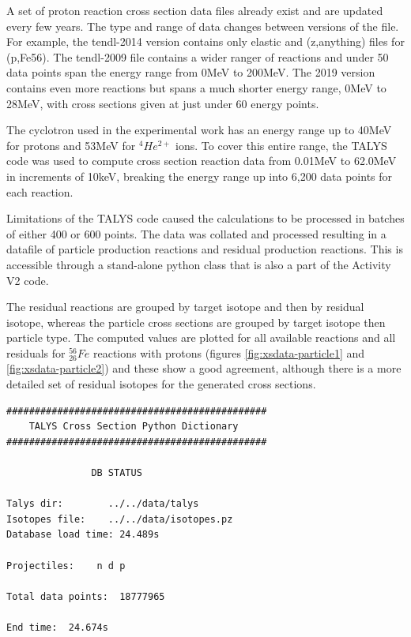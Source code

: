 A set of proton reaction cross section data files already exist and are updated every few years.  The type and range of data changes between versions of the file.  For example, the \acrshort{tendl}-2014 version contains only elastic and (z,anything) files for (p,Fe56).  The \acrshort{tendl}-2009 file contains a wider ranger of reactions and under 50 data points span the energy range from 0MeV to 200MeV.  The 2019 version contains even more reactions but spans a much shorter energy range, 0MeV to 28MeV, with cross sections given at just under 60 energy points.

The cyclotron used in the experimental work has an energy range up to 40MeV for protons and 53MeV for ${}^{4}He^{2+}$ ions.  To cover this entire range, the TALYS code was used to compute cross section reaction data from 0.01MeV to 62.0MeV in increments of 10keV, breaking the energy range up into 6,200 data points for each reaction.

Limitations of the TALYS code caused the calculations to be processed in batches of either 400 or 600 points.  The data was collated and processed resulting in a datafile of particle production reactions and residual production reactions.  This is accessible through a stand-alone python class that is also a part of the Activity V2 code.

The residual reactions are grouped by target isotope and then by residual isotope, whereas the particle cross sections are grouped by target isotope then particle type.  The computed values are plotted for all available reactions and all residuals for ${}^{56}_{26}Fe$ reactions with protons (figures \ref{fig:xsdata-particle1} and \ref{fig:xsdata-particle2}) and these show a good agreement, although there is a more detailed set of residual isotopes for the generated cross sections.

\FloatBarrier
\begin{lstlisting}[style=sOutputFile,caption={Status report from TALYS database code},label={listing:talysstatus}]
##############################################
    TALYS Cross Section Python Dictionary     
##############################################

               DB STATUS                      

Talys dir:        ../../data/talys
Isotopes file:    ../../data/isotopes.pz
Database load time: 24.489s

Projectiles:    n d p 

Total data points:  18777965

End time:  24.674s
\end{lstlisting}

